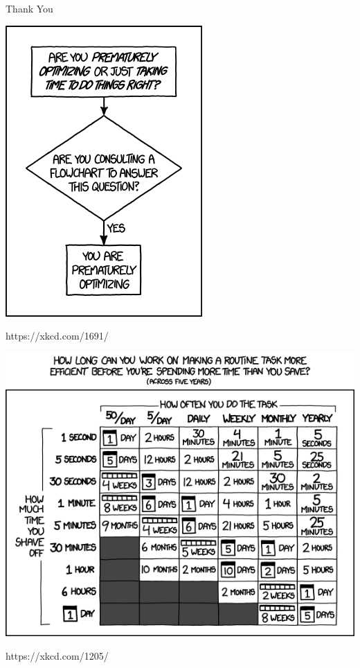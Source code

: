 \documentclass[12pt]{beamer}
\begin{document}
\begin{frame}{Thank You}
  \begin{center}
  \end{center}
\end{frame}

\begin{frame}[plain]
  \begin{center}
    \includegraphics[height=\textheight]{optimization.png}
    
    {\tiny https://xkcd.com/1691/}
  \end{center}
  
\end{frame}

\begin{frame}[plain]
  \begin{center}
    \includegraphics[height=\textheight]{is_it_worth_the_time.png}
    
    {\tiny https://xkcd.com/1205/}
  \end{center}
  
\end{frame}
\end{document}
